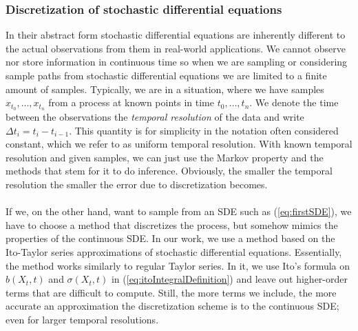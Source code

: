 \subsubsection{Discretization of stochastic differential equations}\label{subsubsec:Discretization}
In their abstract form stochastic differential equations are inherently different to the actual observations from them in real-world applications.
We cannot observe nor store information in continuous time so when we are sampling or considering sample paths from stochastic differential equations we are limited to a finite amount of samples. Typically, we are in a situation, where we have samples $x_{t_0},\dots, x_{t_n}$ from a process at known points in time $t_0,\dots,t_n$. We denote the time between the observations the \textit{temporal resolution} of the data and write $\Delta t_i = t_{i} - t_{i - 1}$. This quantity is for simplicity in the notation often considered constant, which we refer to as uniform temporal resolution. With known temporal resolution and given samples, we can just use the Markov property and the methods that stem for it to do inference. Obviously, the smaller the temporal resolution the smaller the error due to discretization becomes.\\\\
If we, on the other hand, want to sample from an SDE such as (\ref{eq:firstSDE}), we have to choose a method that discretizes the process, but somehow mimics the properties of the continuous SDE. In our work, we use a method based on the Ito-Taylor series approximations of stochastic differential equations. Essentially, the method works similarly to regular Taylor series. In it, we use Ito's formula on $b(X_t, t)$ and $\sigma(X_t, t)$ in (\ref{eq:itoIntegralDefinition}) and leave out higher-order terms that are difficult to compute. Still, the more terms we include, the more accurate an approximation the discretization scheme is to the continuous SDE; even for larger temporal resolutions.

